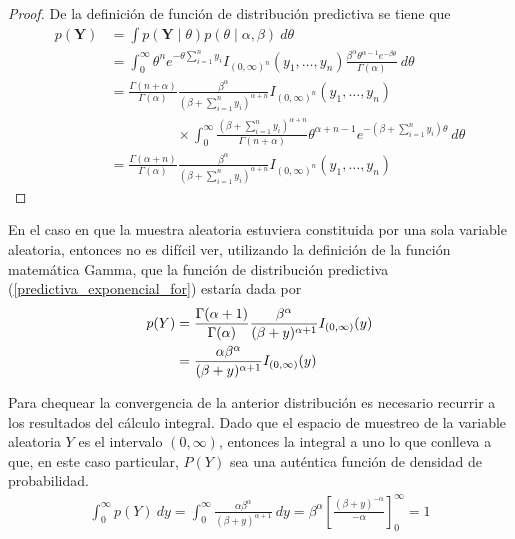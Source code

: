 \documentclass[10pt,openright]{book}\usepackage[]{graphicx}\usepackage[]{color}
\begin{document}
    \begin{proof}
    De la definici\'on de funci\'on de distribuci\'on predictiva se tiene que
    \begin{align*}
    p(\mathbf{Y})&=\int p(\mathbf{Y} \mid \theta)p(\theta \mid \alpha,\beta)\ d\theta\\
    &=\int_0^{\infty}\theta^n e^{-\theta \sum_{i=1}^ny_i}I_{(0,\infty)^n}(y_1,\ldots,y_n)\frac{\beta^\alpha \theta^{\alpha-1} e^{-\beta\theta}}{\Gamma(\alpha)} \ d\theta\\
    &=\frac{\Gamma(n+\alpha)}{\Gamma(\alpha)}\frac{\beta^\alpha}{(\beta+\sum_{i=1}^ny_i)^{\alpha+n}}I_{(0,\infty)^n}(y_1,\ldots,y_n)\\
    &\hspace{2cm}\times
    \int_0^{\infty} \frac{(\beta+\sum_{i=1}^ny_i)^{\alpha+n}}{\Gamma(n+\alpha)} \theta^{\alpha+n-1}e^{-(\beta+\sum_{i=1}^ny_i)\theta}
    \ d\theta\\
    &=\frac{\Gamma(\alpha+n)}{\Gamma(\alpha)}\frac{\beta^\alpha}{(\beta+\sum_{i=1}^ny_i)^{\alpha+n}}I_{(0,\infty)^n}(y_1,\ldots,y_n)
    \end{align*}
    \end{proof}
    
    En el caso en que la muestra aleatoria estuviera constituida por una sola variable aleatoria, entonces no es dif\'icil ver, utilizando la definici\'on de la funci\'on matem\'atica Gamma, que la funci\'on de distribuci\'on predictiva (\ref{predictiva_exponencial_for}) estar\'ia dada por
    \begin{align*}
    p(Y)&=\frac{\Gamma(\alpha+1)}{\Gamma(\alpha)}\frac{\beta^\alpha}{(\beta+y)^{\alpha+1}}
    I_{(0,\infty)}(y)\notag \\
    &=\frac{\alpha \beta^\alpha}{(\beta+y)^{\alpha+1}}
    I_{(0,\infty)}(y)
    \end{align*}
    
    Para chequear la convergencia de la anterior distribuci\'on es necesario recurrir a los resultados del c\'alculo integral. Dado que el espacio de muestreo de la variable aleatoria $Y$ es el intervalo $(0,\infty)$, entonces la integral a uno lo que conlleva a que, en este caso particular, $P(Y)$ sea una aut\'entica funci\'on de densidad de probabilidad.
    \begin{align*}
    \int_0^{\infty}p(Y)\ dy=\int_0^{\infty}\frac{\alpha \beta^\alpha}{(\beta+y)^{\alpha+1}} \ dy
    =  \beta^\alpha \left[\frac{(\beta+y)^{-\alpha}}{-\alpha} \right]_0^{\infty}
    =1
    \end{align*}
    
\end{document}
